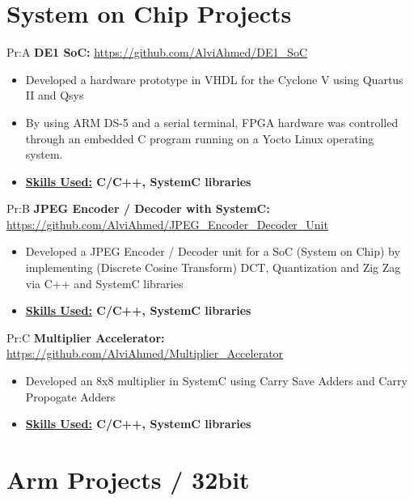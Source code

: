\section*{System on Chip Projects}


Pr:A
\textbf{DE1 SoC: } \underline{\url{https://github.com/AlviAhmed/DE1_SoC}}
\begin{itemize}[noitemsep,nolistsep]
\item Developed a hardware prototype in VHDL for the Cyclone V using Quartus II and Qsys
\item By using ARM DS-5 and a serial terminal, FPGA hardware was controlled through an embedded C program running on a Yocto Linux operating system.
\item \textbf{\underline{Skills Used:} C/C++, SystemC libraries}
\end{itemize}


Pr:B
\textbf{JPEG Encoder / Decoder with SystemC: }
\underline{\url{https://github.com/AlviAhmed/JPEG_Encoder_Decoder_Unit}}
\begin{itemize}[noitemsep,nolistsep]
\item Developed a JPEG Encoder / Decoder unit for a SoC (System on Chip) by implementing
  (Discrete Cosine Transform) DCT, Quantization and Zig Zag via C++ and SystemC libraries
\item \textbf{\underline{Skills Used:} C/C++, SystemC libraries}
\end{itemize}


Pr:C
\textbf{Multiplier Accelerator: }
\underline{\url{https://github.com/AlviAhmed/Multiplier_Accelerator}}
\begin{itemize}[noitemsep,nolistsep]
\item Developed an 8x8 multiplier in SystemC using Carry Save Adders and Carry Propogate Adders
\item \textbf{\underline{Skills Used:} C/C++, SystemC libraries}
\end{itemize}


\section*{Arm Projects / 32bit}


